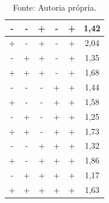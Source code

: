 \begin{table}[H]
\begin{tabular}{|c|c|c|c|c|c|}
  \rowcolor[HTML]{FFFFFF} 
  -                         & -                         & +                         & -                         & +                    & 1,42                         \\ \hline
  \rowcolor[HTML]{EFEFEF} 
  \cellcolor[HTML]{EFEFEF}+ & -                         & \cellcolor[HTML]{EFEFEF}+ & -                         & +                    & 2,04                         \\ \hline
  \rowcolor[HTML]{FFFFFF} 
  -                         & +                         & +                         & -                         & +                    & 1,35                         \\ \hline
  \rowcolor[HTML]{EFEFEF} 
  +                         & +                         & +                         & \cellcolor[HTML]{EFEFEF}- & +                    & \cellcolor[HTML]{EFEFEF}1,68 \\ \hline
  \rowcolor[HTML]{FFFFFF} 
  -                         & -                         & -                         & +                         & +                    & 1,44                         \\ \hline
  \rowcolor[HTML]{EFEFEF} 
  +                         & \cellcolor[HTML]{EFEFEF}- & \cellcolor[HTML]{EFEFEF}- & +                         & +                    & \cellcolor[HTML]{EFEFEF}1,58 \\ \hline
  \rowcolor[HTML]{FFFFFF} 
  -                         & +                         & -                         & +                         & +                    & 1,25                         \\ \hline
  \rowcolor[HTML]{EFEFEF} 
  +                         & +                         & \cellcolor[HTML]{EFEFEF}- & +                         & +                    & \cellcolor[HTML]{EFEFEF}1,73 \\ \hline
  \rowcolor[HTML]{FFFFFF} 
  -                         & -                         & +                         & +                         & +                    & 1,32                         \\ \hline
  \rowcolor[HTML]{EFEFEF} 
  +                         & \cellcolor[HTML]{EFEFEF}- & +                         & +                         & +                    & \cellcolor[HTML]{EFEFEF}1,86 \\ \hline
  \rowcolor[HTML]{FFFFFF} 
  -                         & +                         & +                         & +                         & +                    & 1,17                         \\ \hline
  \rowcolor[HTML]{EFEFEF} 
  +                         & +                         & +                         & +                         & +                    & 1,63                         \\ \hline
  \end{tabular}
  \label{tab:dados_experimento}
  \caption*{Fonte: Autoria própria.}
  \end{table}

